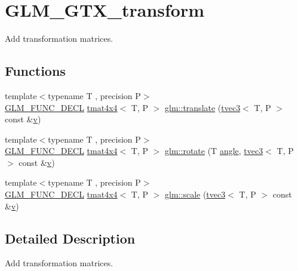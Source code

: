 \hypertarget{group__gtx__transform}{}\section{G\+L\+M\+\_\+\+G\+T\+X\+\_\+transform}
\label{group__gtx__transform}


Add transformation matrices.  


\subsection*{Functions}
\begin{DoxyCompactItemize}
\item 
{\footnotesize template$<$typename T , precision P$>$ }\\\mbox{\hyperlink{setup_8hpp_ab2d052de21a70539923e9bcbf6e83a51}{G\+L\+M\+\_\+\+F\+U\+N\+C\+\_\+\+D\+E\+CL}} \mbox{\hyperlink{structglm_1_1tmat4x4}{tmat4x4}}$<$ T, P $>$ \mbox{\hyperlink{group__gtx__transform_ga838c4505ef7f254ed05117b1ac9691fb}{glm\+::translate}} (\mbox{\hyperlink{structglm_1_1tvec3}{tvec3}}$<$ T, P $>$ const \&\mbox{\hyperlink{glad_8h_a14cfbe2fc2234f5504618905b69d1e06}{v}})
\item 
{\footnotesize template$<$typename T , precision P$>$ }\\\mbox{\hyperlink{setup_8hpp_ab2d052de21a70539923e9bcbf6e83a51}{G\+L\+M\+\_\+\+F\+U\+N\+C\+\_\+\+D\+E\+CL}} \mbox{\hyperlink{structglm_1_1tmat4x4}{tmat4x4}}$<$ T, P $>$ \mbox{\hyperlink{group__gtx__transform_ga2020c91bf61e050882b3a5c18eada700}{glm\+::rotate}} (T \mbox{\hyperlink{group__gtc__quaternion_gad4a4448baedb198b2b1e7880d2544dc9}{angle}}, \mbox{\hyperlink{structglm_1_1tvec3}{tvec3}}$<$ T, P $>$ const \&\mbox{\hyperlink{glad_8h_a14cfbe2fc2234f5504618905b69d1e06}{v}})
\item 
{\footnotesize template$<$typename T , precision P$>$ }\\\mbox{\hyperlink{setup_8hpp_ab2d052de21a70539923e9bcbf6e83a51}{G\+L\+M\+\_\+\+F\+U\+N\+C\+\_\+\+D\+E\+CL}} \mbox{\hyperlink{structglm_1_1tmat4x4}{tmat4x4}}$<$ T, P $>$ \mbox{\hyperlink{group__gtx__transform_ga1972d4a66a2e92637c8aaee598417a71}{glm\+::scale}} (\mbox{\hyperlink{structglm_1_1tvec3}{tvec3}}$<$ T, P $>$ const \&\mbox{\hyperlink{glad_8h_a14cfbe2fc2234f5504618905b69d1e06}{v}})
\end{DoxyCompactItemize}


\subsection{Detailed Description}
Add transformation matrices. 

